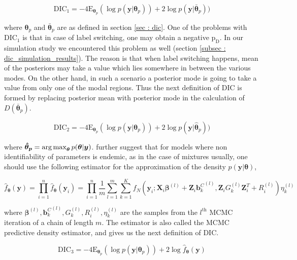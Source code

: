 \begin{equation}
\label{eq : DIC1}
\text{DIC}_1 = -4\text{E}_{\boldsymbol{\theta}_p} (\log{p(\boldsymbol{y}|\boldsymbol{\theta}_p)}) + 2\log{p(\boldsymbol{y}|\boldsymbol{\bar{\theta}}_p)})
\end{equation}

where 
$\boldsymbol{\theta}_p$ and $\boldsymbol{\bar{\theta}}_p$ are as defined in section \ref{sec : dic}. One of the problems with $\text{DIC}_1$ is that in case of label switching, one may obtain a negative $\text{p}_\text{D}$. In our simulation study we encountered this problem as well (section \ref{subsec : dic_simulation_results}). The reason is that when label switching happens, mean of the posteriors may take a value which lies somewhere in between the various modes. On the other hand, in such a scenario a posterior mode is going to take a value from only one of the modal regions. Thus the next definition of DIC is formed by replacing posterior mean with posterior mode in the calculation of $D(\boldsymbol{\bar{\theta}}_p)$. 

\begin{equation}
\label{eq : DIC2}
\text{DIC}_2 = -4\text{E}_{\boldsymbol{\theta}_p} (\log{p(\boldsymbol{y}|\boldsymbol{\theta}_p)}) + 2\log{p(\boldsymbol{y}|\boldsymbol{\hat{\theta}}_p)})
\end{equation}

where
$\boldsymbol{\hat{\theta}_p} = \operatorname*{arg\,max}_{\boldsymbol{\theta}}p(\boldsymbol{\theta}|\boldsymbol{y})$. \citet{celeux_deviance_2006} further suggest that for models where non identifiability of parameters is endemic, as in the case of mixtures usually, one should use the following estimator for the approximation of the density $p(\boldsymbol{y}|\boldsymbol{\theta})$,

$$\hat{f}_{\boldsymbol{\theta}}(\boldsymbol{y}) = \prod_{i=1}^n \hat{f}_{\boldsymbol{\theta}}(\boldsymbol{y}_i) = \prod_{i=1}^n \frac 1 m \sum_{l=1}^m \sum_{k=1}^K f_N(\boldsymbol{y}_i; \boldsymbol{X}_i\boldsymbol{\beta}^{(l)} + \boldsymbol{Z}_i {\boldsymbol{b}_k^C}^{(l)}, \boldsymbol{Z}_{i} G_k^{(l)} \boldsymbol{Z}_{i}^T+ R_i^{(l)}) \eta_k^{(l)}$$

where $\boldsymbol{\beta}^{(l)}, {\boldsymbol{b}_k^C}^{(l)}, G_k^{(l)}, R_i^{(l)}, \eta_k^{(l)}$ are the samples from the $l^{\text{th}}$ MCMC iteration of a chain of length $m$.  The estimator is also called the MCMC predictive density estimator, and gives us the next definition of DIC.

\begin{equation}
\label{eq : DIC3}
\text{DIC}_3 =-4\text{E}_{\boldsymbol{\theta}_p} (\log{p(\boldsymbol{y}|\boldsymbol{\theta}_p)}) + 2\log{\hat{f}_{\boldsymbol{\theta}}(\boldsymbol{y})}
\end{equation}

